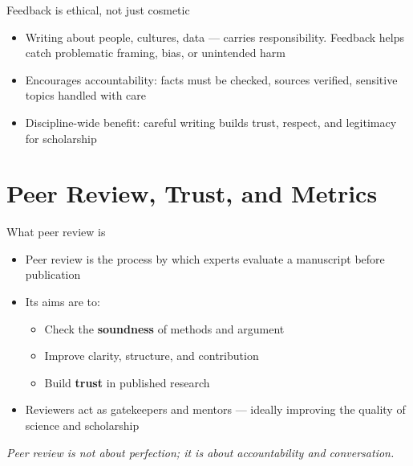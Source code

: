 \documentclass[aspectratio=169]{beamer}
\begin{document}
\begin{frame}{Feedback is ethical, not just cosmetic}
\begin{itemize}
  \item Writing about people, cultures, data — carries responsibility. Feedback helps catch problematic framing, bias, or unintended harm
  \item Encourages accountability: facts must be checked, sources verified, sensitive topics handled with care
  \item Discipline-wide benefit: careful writing builds trust, respect, and legitimacy for scholarship
\end{itemize}
\end{frame}


\section{Peer Review, Trust, and Metrics}

\begin{frame}{What peer review is}
\begin{itemize}
  \item Peer review is the process by which experts evaluate a manuscript before publication
  \item Its aims are to:
    \begin{itemize}
      \item Check the \textbf{soundness} of methods and argument
      \item Improve clarity, structure, and contribution
      \item Build \textbf{trust} in published research
    \end{itemize}
  \item Reviewers act as gatekeepers and mentors — ideally improving the quality of science and scholarship
\end{itemize}
\textit{Peer review is not about perfection; it is about accountability and conversation.}
\end{frame}
\end{document}
